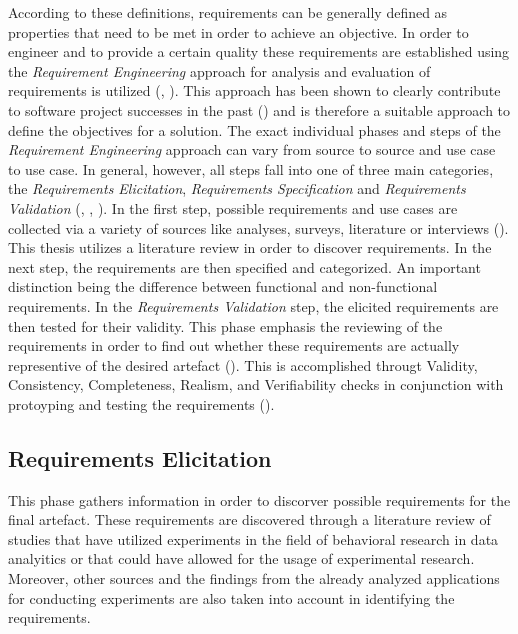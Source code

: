 According to these definitions, requirements can be generally defined as properties that need to be met in order to achieve an objective. In order to engineer and to provide a certain quality these requirements are established using the \textit{Requirement Engineering} approach for analysis and evaluation of requirements is utilized (\cite{SWEBOK.2004}, \cite{Sommerville.2011}). This approach has been shown to clearly contribute to software project successes in the past (\cite{Hofmann.2001}) and is therefore a suitable approach to define the objectives for a solution. The exact individual phases and steps of the \textit{Requirement Engineering} approach can vary from source to source and use case to use case. In general, however, all steps fall into one of three main categories, the \textit{Requirements Elicitation}, \textit{Requirements Specification} and \textit{Requirements Validation} (\cite{SWEBOK.2004}, \cite{Sommerville.2011}, \cite{Fernandes.2009}). In the first step, possible requirements and use cases are collected via a variety of sources like analyses, surveys, literature or interviews (\cite{Sommerville.2011}). This thesis utilizes a literature review in order to discover requirements. In the next step, the requirements are then specified and categorized. An important distinction being the difference between functional and non-functional requirements. In the \textit{Requirements Validation} step, the elicited requirements are then tested for their validity. This phase emphasis the reviewing of the requirements in order to find out whether these requirements are actually representive of the desired artefact (\cite{Sommerville.2011}). This is accomplished througt Validity, Consistency, Completeness, Realism, and Verifiability checks in conjunction with protoyping and testing the requirements (\cite{Sommerville.2011}).

\subsection{Requirements Elicitation}

This phase gathers information in order to discorver possible requirements for the final artefact. These requirements are discovered through a literature review of studies that have utilized experiments in the field of behavioral research in data analyitics or that could have allowed for the usage of experimental research. Moreover, other sources and the findings from the already analyzed applications for conducting experiments are also taken into account in identifying the requirements.

